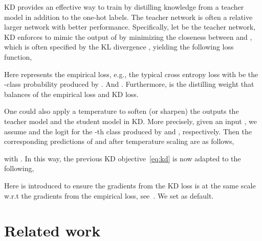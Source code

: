 \documentclass{article}
\begin{document}
KD provides an effective way to train  by distilling knowledge from a teacher model in addition to the one-hot labels. 
The teacher network is often a relative larger network with better performance. 
Specifically, let  be the teacher network, KD enforces  to mimic the output of  by minimizing the closeness between  and , which is often specified by the KL divergence , 
yielding the following loss function, 

Here  represents the empirical loss,  e.g., the typical cross entropy loss  with  be the -class probability produced by . And . Furthermore,  is the distilling weight that balances of the empirical loss and KD loss.

One could also apply a temperature  to soften (or sharpen) the outputs the teacher model and the student model in KD.  More precisely, given an input , we assume  and  the logit for the -th class produced by  and , respectively. Then the corresponding predictions of  and  after temperature scaling are as follows,  

with . 
In this way, the previous KD objective~\eqref{eq:kd} 
is now adapted to the following, 
 
Here  is introduced to ensure the gradients from the KD loss is at the same scale w.r.t the gradients from the empirical loss, see~\citep[e.g.,][]{hinton2015distilling}. 
We set  as default. 


\section{Related work}
\end{document}
